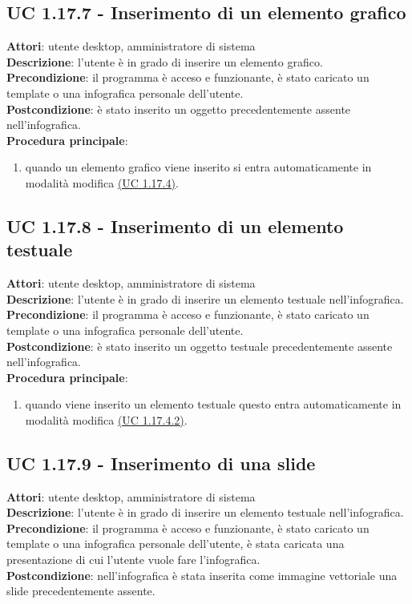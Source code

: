 \subsection{UC 1.17.7 - Inserimento di un elemento grafico}{
	\label{uc1.17.7}
	\textbf{Attori}: utente desktop, amministratore di sistema \\
	\textbf{Descrizione}: l'utente è in grado di inserire un elemento grafico. \\
	\textbf{Precondizione}: il programma è acceso e funzionante, è stato caricato un template o una infografica personale dell'utente.	\\
	\textbf{Postcondizione}: è stato inserito un oggetto precedentemente assente nell'infografica.	\\
	\textbf{Procedura principale}:
	\begin{enumerate}
		\item quando un elemento grafico viene inserito si entra automaticamente in modalità modifica \hyperref[uc1.17.4]{(UC 1.17.4)}.
	\end{enumerate}
	}
\subsection{UC 1.17.8 - Inserimento di un elemento testuale}{
	\label{uc1.17.8}
	\textbf{Attori}: utente desktop, amministratore di sistema \\
	\textbf{Descrizione}: l'utente è in grado di inserire un elemento testuale nell'infografica. \\
	\textbf{Precondizione}: il programma è acceso e funzionante, è stato caricato un template o una infografica personale dell'utente.	\\
	\textbf{Postcondizione}: è stato inserito un oggetto testuale precedentemente assente nell'infografica.	\\
	\textbf{Procedura principale}:
	\begin{enumerate}
		\item quando viene inserito un elemento testuale questo entra automaticamente in modalità modifica \hyperref[uc1.17.4.2]{(UC 1.17.4.2)}.
	\end{enumerate}
	}
\subsection{UC 1.17.9 - Inserimento di una slide}{
	\label{uc1.17.9}
	\textbf{Attori}: utente desktop, amministratore di sistema \\
	\textbf{Descrizione}: l'utente è in grado di inserire un elemento testuale nell'infografica. \\
	\textbf{Precondizione}: il programma è acceso e funzionante, è stato caricato un template o una infografica personale dell'utente, è stata caricata una presentazione di cui l'utente vuole fare l'infografica.	\\
	\textbf{Postcondizione}: nell'infografica è stata inserita come immagine vettoriale una slide precedentemente assente.	\\
	}
